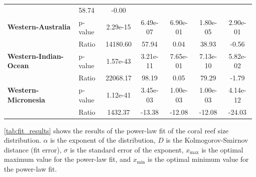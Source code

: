 \begin{table}[H]
{\begin{tabular}{llccccc}
                                                                & 58.74    &
            -0.00
            \\
            \textbf{Western-Australia}                          & p-value  &
            2.29e-15                                            & 6.49e-07 &
            6.90e-01                                            & 1.80e-05 &
            2.90e-01
            \\
            \textbf{}                                           & Ratio    &
            14180.60                                            & 57.94    &
            0.04
                                                                & 38.93    &
            -0.56
            \\
            \textbf{Western-Indian-Ocean}                       & p-value  &
            1.57e-43                                            & 3.21e-11 &
            7.65e-01                                            & 7.13e-10 &
            5.82e-02
            \\
            \textbf{}                                           & Ratio    &
            22068.17                                            & 98.19    &
            0.05
                                                                & 79.29    &
            -1.79
            \\
            \textbf{Western-Micronesia}                         & p-value  &
            1.12e-41                                            & 3.45e-03 &
            1.00e-03                                            & 1.00e-03 &
            4.14e-12
            \\
            \textbf{}                                           & Ratio    &
            1432.37                                             & -13.38   &
            -12.08
                                                                & -12.08   &
            -24.03
            \\ \hline
        \end{tabular}%
    }
\end{table}

\cref{tab:fit_results} shows the results of the
power-law fit of the coral reef size distribution. $\alpha$ is the exponent of
the distribution, $D$ is the Kolmogorov-Smirnov distance (fit error), $\sigma$
is the standard error of the exponent, $x_{\mathrm{max}}$ is the optimal
maximum
value for the power-law fit, and $x_{\mathrm{min}}$ is the optimal minimum
value
for the power-law fit.

